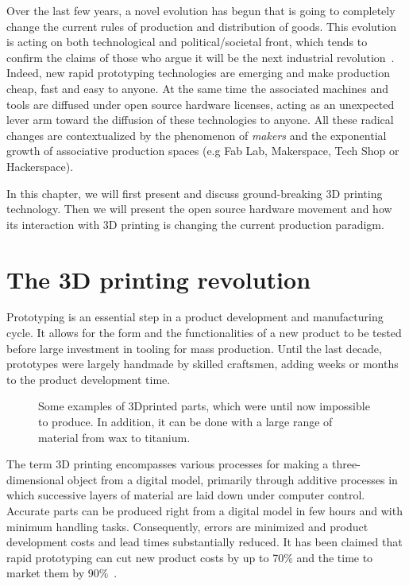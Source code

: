 Over the last few years, a novel evolution has begun that is going to completely change the current rules of production and distribution of goods. This evolution is acting on both technological and political/societal front, which tends to confirm the claims of those who argue it will be the next industrial revolution~\parencite{anderson2012makers}. Indeed, new rapid prototyping technologies are emerging and make production cheap, fast and easy to anyone. At the same time the associated machines and tools are diffused under open source hardware licenses, acting as an unexpected lever arm toward the diffusion of these technologies to anyone. All these radical changes are contextualized by the phenomenon of \emph{makers} and the exponential growth of associative production spaces (e.g Fab Lab, Makerspace, Tech Shop or Hackerspace).

In this chapter, we will first present and discuss ground-breaking 3D printing technology. Then we will present the open source hardware movement and how its interaction with 3D printing is changing the current production paradigm.


\section{The 3D printing revolution} %

Prototyping is an essential step in a product development and manufacturing cycle. It allows for the form and the functionalities of a new product to be tested before large investment in tooling for mass production. Until the last decade, prototypes were largely handmade by skilled craftsmen, adding weeks or months to the product development time.

\begin{figure}[tb]
\centering
    \hfil
    \hfil
    \caption{Some examples of 3Dprinted parts, which were until now impossible to produce. In addition, it can be done with a large range of material from wax to titanium.}
    \label{fig:3D_printed_objects}
\end{figure}

The term 3D printing  encompasses various processes for making a three-dimensional object from a digital model, primarily through additive processes in which successive layers of material are laid down under computer control.
Accurate parts can be produced right from a digital model in few hours and with minimum handling tasks. Consequently, errors are minimized and product development costs and lead times substantially reduced. It has been claimed that rapid prototyping can cut new product costs by up to 70\% and the time to market them by 90\%~\parencite{waterman1994rapid}.

